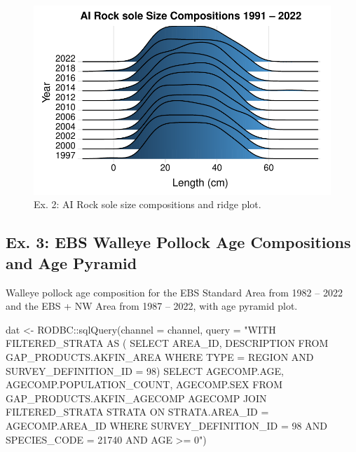 \documentclass[
  letterpaper,
  oneside,
  open=any]{scrbook}
\newenvironment{Shaded}{\begin{snugshade}}{\end{snugshade}}
\newcommand{\AttributeTok}[1]{\textcolor[rgb]{0.40,0.45,0.13}{#1}}
\newcommand{\FunctionTok}[1]{\textcolor[rgb]{0.28,0.35,0.67}{#1}}
\newcommand{\NormalTok}[1]{\textcolor[rgb]{0.00,0.23,0.31}{#1}}
\newcommand{\OtherTok}[1]{\textcolor[rgb]{0.00,0.23,0.31}{#1}}
\newcommand{\SpecialCharTok}[1]{\textcolor[rgb]{0.37,0.37,0.37}{#1}}
\newcommand{\StringTok}[1]{\textcolor[rgb]{0.13,0.47,0.30}{#1}}
\begin{document}
\begin{figure}[H]

{\centering \includegraphics{content/akfin-oracle-sql-r_files/figure-pdf/test-2-plot-1.pdf}

}

\caption{Ex. 2: AI Rock sole size compositions and ridge plot.}

\end{figure}

\hypertarget{ex.-3-ebs-walleye-pollock-age-compositions-and-age-pyramid}{%
\subsection{Ex. 3: EBS Walleye Pollock Age Compositions and Age
Pyramid}\label{ex.-3-ebs-walleye-pollock-age-compositions-and-age-pyramid}}

Walleye pollock age composition for the EBS Standard Area from 1982 --
2022 and the EBS + NW Area from 1987 -- 2022, with age pyramid plot.

\begin{Shaded}
\begin{Highlighting}[]
\NormalTok{dat }\OtherTok{\textless{}{-}}\NormalTok{ RODBC}\SpecialCharTok{::}\FunctionTok{sqlQuery}\NormalTok{(}\AttributeTok{channel =}\NormalTok{ channel, }
                       \AttributeTok{query =} 
\StringTok{"WITH FILTERED\_STRATA AS (}
\StringTok{SELECT }
\StringTok{AREA\_ID, }
\StringTok{DESCRIPTION }
\StringTok{FROM GAP\_PRODUCTS.AKFIN\_AREA}
\StringTok{WHERE TYPE = \textquotesingle{}REGION\textquotesingle{} AND }
\StringTok{SURVEY\_DEFINITION\_ID = 98)}
\StringTok{SELECT }
\StringTok{AGECOMP.AGE, }
\StringTok{AGECOMP.POPULATION\_COUNT, }
\StringTok{AGECOMP.SEX}
\StringTok{FROM GAP\_PRODUCTS.AKFIN\_AGECOMP AGECOMP}
\StringTok{JOIN FILTERED\_STRATA STRATA }
\StringTok{ON STRATA.AREA\_ID = AGECOMP.AREA\_ID}
\StringTok{WHERE SURVEY\_DEFINITION\_ID = 98 }
\StringTok{AND SPECIES\_CODE = 21740}
\StringTok{AND AGE \textgreater{}= 0"}\NormalTok{)}
\end{Highlighting}
\end{Shaded}
\end{document}
